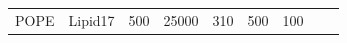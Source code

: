 \documentclass[journal=jpcbfk]{achemso}
\begin{document}
\begin{table}[htb]
\begin{minipage}[t]{\textwidth}
{\begin{tabular}{l c r r r r r c c}
      \hline
      POPE	& Lipid17 \cite{gould18} %
      		& 500 & 25000 %
		&  310  & 500 & 100 & \citenum{POPElipid17} \\
    \end{tabular}
    }
  \end{minipage}
\end{table}
\end{document}
